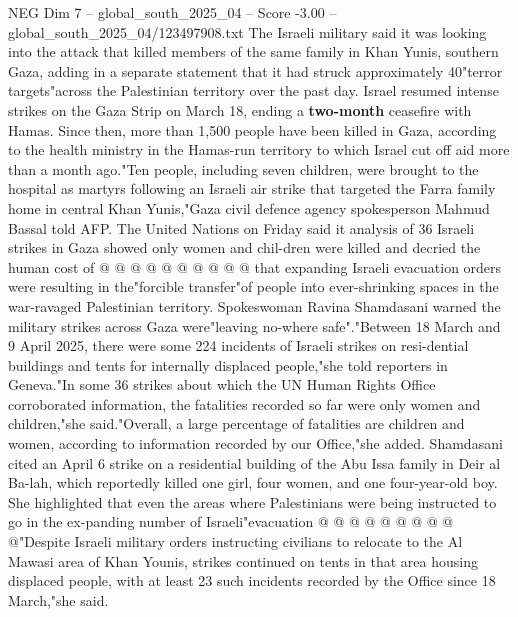 \begin{textsample}{NEG Dim 7 – global\_south\_2025\_04 – Score -3.00 – global\_south\_2025\_04/123497908.txt}
The Israeli military said it was looking into the attack that killed members of the same family in Khan Yunis, southern Gaza, adding in a separate statement that it had struck approximately 40"terror targets"across the Palestinian territory over the past day.
Israel resumed intense strikes on the Gaza Strip on March 18, ending a \textbf{two-month} ceasefire with Hamas.
Since then, more than 1,500 people have been killed in Gaza, according to the health ministry in the Hamas-run territory to which Israel cut off aid more than a month ago."Ten people, including seven children, were brought to the hospital as martyrs following an Israeli air strike that targeted the Farra family home in central Khan Yunis,"Gaza civil defence agency spokesperson Mahmud Bassal told AFP.
The United Nations on Friday said it analysis of 36 Israeli strikes in Gaza showed only women and chil-dren were killed and decried the human cost of @ @ @ @ @ @ @ @ @ @ that expanding Israeli evacuation orders were resulting in the"forcible transfer"of people into ever-shrinking spaces in the war-ravaged Palestinian territory.
Spokeswoman Ravina Shamdasani warned the military strikes across Gaza were"leaving no-where safe"."Between 18 March and 9 April 2025, there were some 224 incidents of Israeli strikes on resi-dential buildings and tents for internally displaced people,"she told reporters in Geneva."In some 36 strikes about which the UN Human Rights Office corroborated information, the fatalities recorded so far were only women and children,"she said."Overall, a large percentage of fatalities are children and women, according to information recorded by our Office,"she added.
Shamdasani cited an April 6 strike on a residential building of the Abu Issa family in Deir al Ba-lah, which reportedly killed one girl, four women, and one four-year-old boy.
She highlighted that even the areas where Palestinians were being instructed to go in the ex-panding number of Israeli"evacuation @ @ @ @ @ @ @ @ @ @"Despite Israeli military orders instructing civilians to relocate to the Al Mawasi area of Khan Younis, strikes continued on tents in that area housing displaced people, with at least 23 such incidents recorded by the Office since 18 March,"she said.

\end{textsample}
